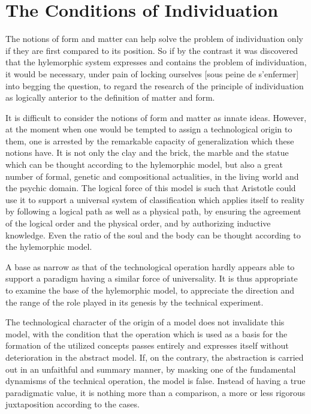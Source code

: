 \documentclass[a4paper]{article}
\begin{document}
\newpage
\tableofcontents{}


\newpage
\section{The Conditions of Individuation}

The notions of form and matter can help solve the problem of individuation only if they are first compared to its position. So if by the contrast it was discovered that the hylemorphic system expresses and contains the problem of individuation, it would be necessary, under pain of locking ourselves [sous peine de s’enfermer] into begging the question, to regard the research of the principle of individuation as logically anterior to the definition of matter and form.

It is difficult to consider the notions of form and matter as innate ideas. However, at the moment when one would be tempted to assign a technological origin to them, one is arrested by the remarkable capacity of generalization which these notions have. It is not only the clay and the brick, the marble and the statue which can be thought according to the hylemorphic model, but also a great number of formal, genetic and compositional actualities, in the living world and the psychic domain. The logical force of this model is such that Aristotle could use it to support a universal system of classification which applies itself to reality by following a logical path as well as a physical path, by ensuring the agreement of the logical order and the physical order, and by authorizing inductive knowledge. Even the ratio of the soul and the body can be thought according to the hylemorphic model.


A base as narrow as that of the technological operation hardly appears able to support a paradigm having a similar force of universality. It is thus appropriate to examine the base of the hylemorphic model, to appreciate the direction and the range of the role played in its genesis by the technical experiment.

The technological character of the origin of a model does not invalidate this model, with the condition that the operation which is used as a basis for the formation of the utilized concepts passes entirely and expresses itself without deterioration in the abstract model. If, on the contrary, the abstraction is carried out in an unfaithful and summary manner, by masking one of the fundamental dynamisms of the technical operation, the model is false. Instead of having a true paradigmatic value, it is nothing more than a comparison, a more or less rigorous juxtaposition according to the cases.
\end{document}
